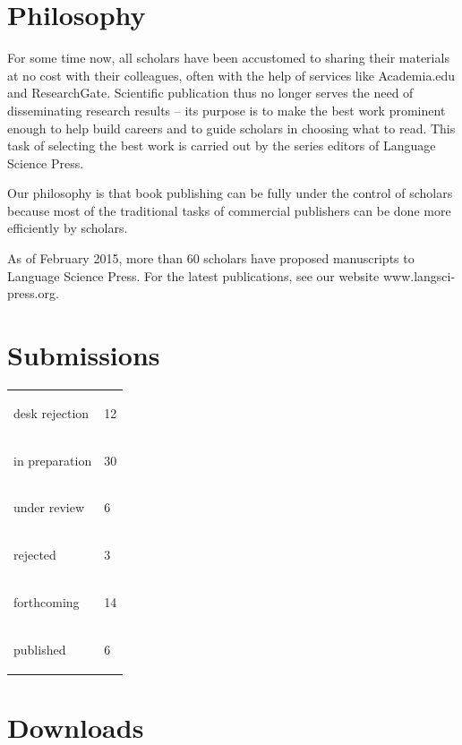 \documentclass[
notumble,
nofoldmark,
]{leaflet}
\begin{document}
 \section{\sffamily\Large Philosophy}
 \parbox{\textwidth}{
 For some time now, all scholars have been accustomed to sharing their materials at no cost with their colleagues, often with the help of services like Academia.edu and ResearchGate. Scientific publication thus no longer serves the need of disseminating research results -- its purpose is to make the best work prominent enough to help build careers and to guide scholars in choosing what to read. This task of selecting the best work is carried out by the series editors of Language Science Press.

 Our philosophy is that book publishing can be fully under the control of scholars because most of the traditional tasks of commercial publishers can be done more efficiently by scholars. 
 
As of February 2015, more than 60 scholars have proposed manuscripts to Language Science Press. For the latest publications, see our website www.langsci-press.org.
 }     
   
   
\newpage 
\section{\sffamily\Large Submissions}
\color{LIGHTGRAY}
\begin{tabular}{ll}
 desk rejection & \colorbox{lsRed}{\parbox{12mm}{12}}\\
in preparation &  \colorbox{lsLightBlue}{\parbox{30mm}{30}}\\
under review & \colorbox{lsDarkBlue}{\parbox{6mm}{6}} \\
rejected & \colorbox{lsLightWine}{\parbox{3mm}{3}} \\
forthcoming &  \colorbox{lsMidGreen}{\parbox{14mm}{14}}\\
published & \colorbox{lsRichGreen}{\parbox{6mm}{6}} \\
\end{tabular}


 


\section{ \sffamily \Large Downloads}
\end{document}
